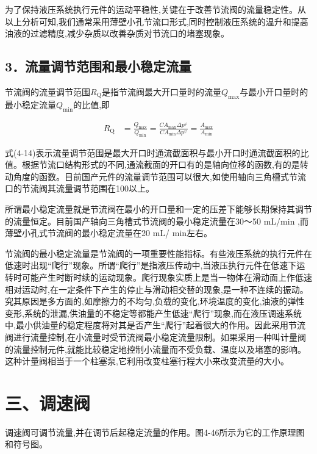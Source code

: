 为了保持液压系统执行元件的运动平稳性,关键在于改善节流阀的流量稳定性。从以上分析可知,我们通常采用薄壁小孔节流口形式,同时控制液压系统的温升和提高油液的过滤精度,减少杂质以改善杂质对节流口的堵塞现象。

\subsection*{3．流量调节范围和最小稳定流量}

节流阀的流量调节范围$R_\text{Q}$是指节流阀最大开口量时的流量$Q_\text{max}$与最小开口量时的最小稳定流量$Q_\text{min}$的比值,即

\begin{equation}
\begin{split}
R_\text{Q} & =\frac{Q_\text{max}}{Q_\text{min}} = \frac{CA_\text{max}\Delta p^\varphi}{CA_\text{min}\Delta p^\varphi} = \frac{A_\text{max}}{A_\text{min}}
\end{split}
\end{equation}

式(4-14)表示流量调节范围是最大开口时通流截面积与最小开口时通流截面积的比值。根据节流口结构形式的不同,通流截面的开口有的是轴向位移的函数,有的是转动角度的函数。目前国产元件的流量调节范围可以很大,如使用轴向三角槽式节流口的节流阀其流量调节范围在100以上。

所谓最小稳定流量就是节流阀在最小的开口量和一定的压差下能够长期保持其调节的流量恒定。目前国产轴向三角槽式节流阀的最小稳定流量在30～50 mL/min ,而薄壁小孔式节流阀的最小稳定流量在20 mL/ min左右。

节流阀的最小稳定流量是节流阀的一项重要性能指标。有些液压系统的执行元件在低速时出现“爬行”现象。所谓“爬行”是指液压传动中,当液压执行元件在低速下运转时可能产生时断时续的运动现象。爬行现象实质上是当一物体在滑动面上作低速相对运动时,在一定条件下产生的停止与滑动相交替的现象,是一种不连续的振动。究其原因是多方面的,如摩擦力的不均匀,负载的变化,环境温度的变化,油液的弹性变形,系统的泄漏,供油量的不稳定等都能产生低速“爬行”现象,而在液压调速系统中,最小供油量的稳定程度将对其是否产生“爬行”起着很大的作用。因此采用节流阀进行流量控制,在小流量时受节流阀最小稳定流量限制。如果采用一种叫计量阀的流量控制元件,就能比较稳定地控制小流量而不受负载、温度以及堵塞的影响。这种计量阀相当于一个柱塞泵,它利用改变柱塞行程大小来改变流量的大小。

\section*{三、调速阀}

调速阀可调节流量,并在调节后起稳定流量的作用。图4-46所示为它的工作原理图和符号图。

